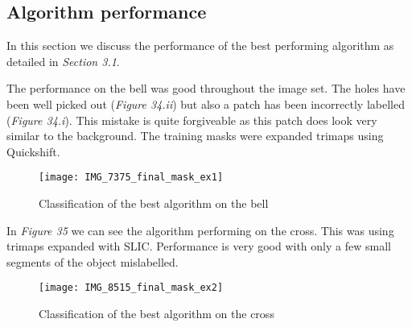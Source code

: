 \documentclass[12pt]{IIBproject}
\begin{document}
\subsection{Algorithm performance}
In this section we discuss the performance of the best performing algorithm as detailed in \emph{Section 3.1}. 

The performance on the bell was good throughout the image set. The holes have been well picked out (\emph{Figure 34.ii}) but also a patch has been incorrectly labelled (\emph{Figure 34.i}). This mistake is quite forgiveable as this patch does look very similar to the background. The training masks were expanded trimaps using Quickshift.
\begin{figure}[H]
  
  \centering
    \texttt{[image: IMG\_7375\_final\_mask\_ex1]}
    \caption{Classification of the best algorithm on the bell}
\end{figure}

In \emph{Figure 35} we can see the algorithm performing on the cross. This was using trimaps expanded with SLIC. Performance is very good with only a few small segments of the object mislabelled. 
\begin{figure}[H]
  
  \centering
    \texttt{[image: IMG\_8515\_final\_mask\_ex2]}
    \caption{Classification of the best algorithm on the cross}
\end{figure}
\end{document}
